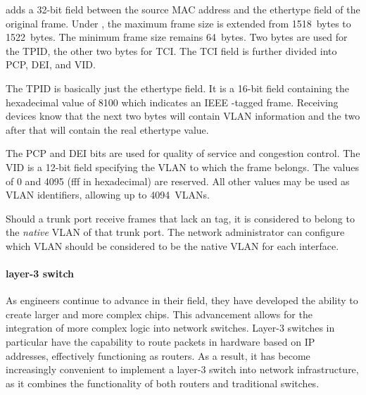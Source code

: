  adds a 32-bit field between the source \acs{MAC} address and the ethertype field of the original frame.
Under , the maximum frame size is extended from 1518~bytes to 1522~bytes.
The minimum frame size remains 64~bytes.
Two bytes are used for the \acf{TPID}, the other two bytes for \acf{TCI}.
The \acs{TCI} field is further divided into \acs{PCP}, \acs{DEI}, and \acs{VID}.


The \acl{TPID} is basically just the ethertype field.
It is a 16-bit field containing the hexadecimal value of 8100 which indicates an \acs{IEEE} -tagged frame.
Receiving devices know that the next two bytes will contain \acs{VLAN} information and the two after that will contain the real ethertype value.

The \acs{PCP} and \acs{DEI} bits are used for quality of service and congestion control.
The \acl{VID} is a 12-bit field specifying the \acs{VLAN} to which the frame belongs.
The values of 0 and 4095 (f{}f{}f in hexadecimal) are reserved.
All other values may be used as \acs{VLAN} identifiers, allowing up to 4094~\acp{VLAN}.

Should a trunk port receive frames that lack an  tag, it is considered to belong to the \emph{native} \acs{VLAN} of that trunk port.
The network administrator can configure which \acs{VLAN} should be considered to be the native \acs{VLAN} for each interface.





\paragraph{layer-3 switch}
As engineers continue to advance in their field, they have developed the ability to create larger and more complex chips.
This advancement allows for the integration of more complex logic into network switches.
Layer-3 switches in particular have the capability to route packets in hardware based on \acs{IP} addresses, effectively functioning as routers.
As a result, it has become increasingly convenient to implement a layer-3 switch into network infrastructure, as it combines the functionality of both routers and traditional switches.





